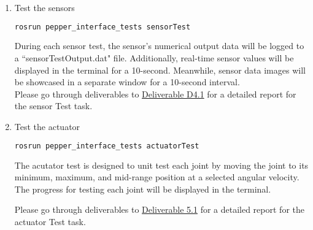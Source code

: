 \documentclass{CSSRforAfrica}
\begin{document}
{\begin{enumerate}
\item Test the sensors
\begin{lstlisting}[style=withoutNumbering, language=bash]
rosrun pepper_interface_tests sensorTest
\end{lstlisting}
During each sensor test, the sensor's numerical output data will be logged to a ``sensorTestOutput.dat" file. Additionally, real-time sensor values will be displayed in the terminal for a 10-second. Meanwhile, sensor data images will be showcased in a separate window for a 10-second interval.\\

Please go through deliverables to \href{https://cssr4africa.github.io/deliverables/CSSR4Africa_Deliverable_D4.1.pdf}
{Deliverable D4.1} for a detailed report for the sensor Test task.

\item Test the actuator
\begin{lstlisting}[style=withoutNumbering, language=bash]
rosrun pepper_interface_tests actuatorTest
\end{lstlisting}

The acutator test is designed to unit test each joint by moving the joint to its minimum, maximum, and mid-range position at a selected angular velocity. The progress for testing each joint will be displayed in the terminal. 

Please go through deliverables to \href{https://cssr4africa.github.io/deliverables/CSSR4Africa_Deliverable_D5.1.pdf}
{Deliverable 5.1} for a detailed report for the actuator Test task.

\end{enumerate}

\newpage


\newpage

}
\end{document}
